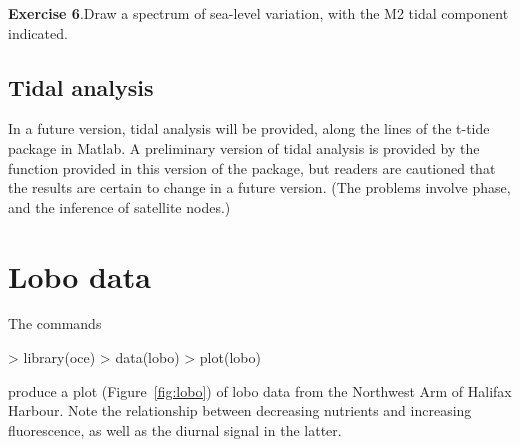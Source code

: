 \documentclass{article}
\newcommand{\workedexercise}[2]{
	\vspace{2ex plus 2ex minus 1ex}
	\begin{boxedminipage}[c]{0.95\linewidth}
		{\textbf{Exercise #1}.\hspace{1em}#2}
	\end{boxedminipage}
	\vspace{2ex plus 2ex minus 1ex}
}
\begin{document}
\workedexercise{6}{Draw a spectrum of sea-level variation, with the M2 tidal component indicated.}

\subsection{Tidal analysis}

In a future version, tidal analysis will be provided, along the lines of the
t-tide package in Matlab.  A preliminary version of tidal analysis is provided
by the \verb@tidem@ function provided in this version of the package, but
readers are cautioned that the results are certain to change in a future
version.  (The problems involve phase, and the inference of satellite nodes.)


\section{Lobo data}
The commands
\begin{Schunk}
\begin{Sinput}
> library(oce)
> data(lobo)
> plot(lobo)
\end{Sinput}
\end{Schunk}
produce a plot (Figure~\ref{fig:lobo}) of lobo data from the Northwest Arm of
Halifax Harbour.  Note the relationship between decreasing nutrients and
increasing fluorescence, as well as the diurnal signal in the latter.
\end{document}
